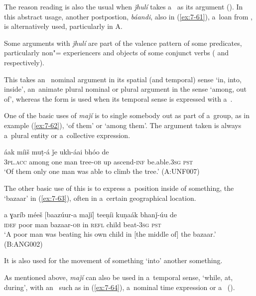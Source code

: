 The reason reading is also the usual when \textit{ǰhulí} takes a~ as its argument (). In this abstract usage, another postpostion, \textit{báandi}, also in (\ref{ex:7-61}), a~loan from , is alternatively used, particularly in A.


Some arguments with \textit{ǰhulí} are part of the valence pattern of some predicates, particularly non"= experiencers and objects of some conjunct verbs ( and  respectively).


 This  takes an~ nominal argument in its spatial (and temporal) sense `in, into, inside', an~animate  plural nominal or  plural argument in the sense `among, out of', whereas the  form is used when its temporal sense is expressed with a~. 


One of the basic uses of \textit{maǰí} is to single somebody out as part of a~group, as in example (\ref{ex:7-62}), `of them' or `among them'. The argument taken is always a~plural entity or a~collective expression.

\begin{exe}
\ex
\label{ex:7-62}
 áak míiš muṭ-á ǰe ukh-áai bhóo de \\
\textsc{3pl.acc} among one man tree-\textsc{ob} up ascend-\textsc{inf}  be.able.\textsc{3sg} \textsc{pst} \\
\glt `Of them only one man was able to climb the tree.' (A:UNF007)
\end{exe}

The other basic use of this  is to express a~position inside of something, the `bazaar' in (\ref{ex:7-63}), often in a~certain geographical location.

\begin{exe}
\ex
\label{ex:7-63}
\gll a ɣaríb méeš [baazúur-a maǰí] teeṇíi kuṇaák bhanǰ-úu de \\
\textsc{idef} poor man bazaar-\textsc{ob} in \textsc{refl} child beat-\textsc{3sg} \textsc{pst} \\
\glt `A poor man was beating his own child in [the middle of] the bazaar.' (B:ANG002)
\end{exe}

It is also used for the movement of something `into' another something.


As mentioned above, \textit{maǰí} can also be used in a~temporal sense, `while, at, during', with an~  such as in (\ref{ex:7-64}), a~nominal time expression or a~ ().

